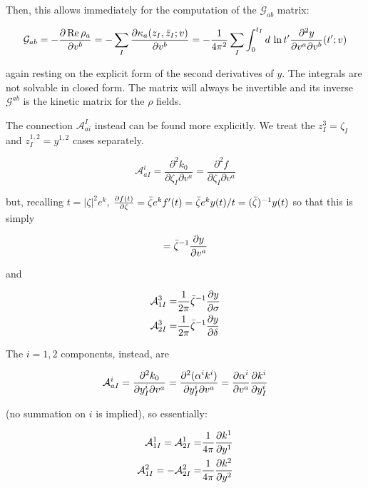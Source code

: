 Then, this allows immediately for the computation of the $\mathcal{G}_{ab}$ matrix:

\begin{equation}
	\mathcal{G}_{ab} = - \frac{\partial\operatorname{Re} \rho_a}{\partial v^b}  = - \sum_I \frac{\partial \kappa_a(z_I,\bar z_I; v)}{\partial v^b} = - \frac{1}{4\pi^2} \sum_I \int_0^{t_I} d\,\ln t' \frac{\partial^2 y}{\partial v^a \partial v^b} (t' ; v)
	\label{Gfinal}
\end{equation}

again resting on the explicit form of the second derivatives of $y$. The integrals are not solvable in closed form. The matrix will always be invertible and its inverse $\mathcal{G}^{ab}$ is the kinetic matrix for the $\rho$ fields.

The connection $\mathcal{A}_{ai}^I$ instead can be found more explicitly. We treat the $z_I^3 = \zeta_I$ and $z_I^{1,2} = y^{1,2}$ cases separately.

\begin{equation}
	\mathcal{A}_{aI}^i = \frac{\partial^2 k_0}{\partial \zeta_I \partial v^a} = \frac{\partial^2 f}{\partial \zeta_I \partial v^a}
	\label{}
\end{equation}

but, recalling $t = |\zeta|^2 e^k$, $\frac{\partial f(t)}{\partial\zeta} = \bar \zeta e^k f'(t) =\bar \zeta e^k y(t)/t = (\bar \zeta)^{-1} y(t)$ so that this is simply

\begin{equation}
	= \bar \zeta^{-1} \frac{\partial y}{\partial v^a}	\label{}
\end{equation}

and

\begin{align}
	\mathcal{A}_{1I}^3 =& \frac{1}{2\pi} \bar \zeta^{-1} \frac{\partial y}{\partial\sigma}\\
	\mathcal{A}_{2I}^3 =& \frac{1}{2\pi} \bar \zeta^{-1} \frac{\partial y}{\partial\delta}
	\label{Afinal3}
\end{align}

The $i=1,2$ components, instead, are

\begin{equation}
	\mathcal{A}_{aI}^i = \frac{\partial^2 k_0}{\partial y_I^i \partial v^a} = \frac{\partial^2 (\alpha^i k^i)}{\partial y_I^i \partial v^a}  = \frac{\partial\alpha^i}{\partial v^a} \frac{\partial k^i}{\partial y_I^i}
	\label{Afinal12}
\end{equation}

(no summation on $i$ is implied), so essentially:

\begin{align}
	\mathcal{A}_{1I}^1 = \mathcal{A}_{2I}^1 = & \frac{1}{4\pi} \frac{\partial k^1}{\partial y^1} \\
	\mathcal{A}_{1I}^2 = - \mathcal{A}_{2I}^2 = & \frac{1}{4\pi} \frac{\partial k^2}{\partial y^2} \\
	\label{}
\end{align}



